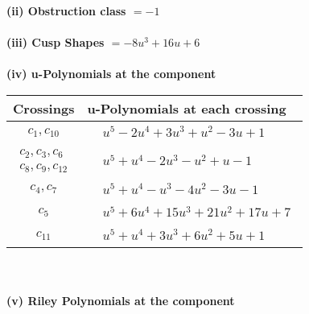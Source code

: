 \documentclass[1p]{elsarticle_modified}
\theoremstyle{definition}
\begin{document}
\flushleft \textbf{(ii) Obstruction class $= -1$}\\~\\
\flushleft \textbf{(iii) Cusp Shapes $= -8 u^3+16 u+6$}\\~\\
\newpage\renewcommand{\arraystretch}{1}
\flushleft \textbf{(iv) u-Polynomials at the component}\newline \\
\begin{tabular}{m{50pt}|m{274pt}}
Crossings & \hspace{64pt}u-Polynomials at each crossing \\
\hline $$\begin{aligned}c_{1},c_{10}\end{aligned}$$&$\begin{aligned}
&u^5-2 u^4+3 u^3+u^2-3 u+1
\end{aligned}$\\
\hline $$\begin{aligned}c_{2},c_{3},c_{6}\\c_{8},c_{9},c_{12}\end{aligned}$$&$\begin{aligned}
&u^5+u^4-2 u^3- u^2+u-1
\end{aligned}$\\
\hline $$\begin{aligned}c_{4},c_{7}\end{aligned}$$&$\begin{aligned}
&u^5+u^4- u^3-4 u^2-3 u-1
\end{aligned}$\\
\hline $$\begin{aligned}c_{5}\end{aligned}$$&$\begin{aligned}
&u^5+6 u^4+15 u^3+21 u^2+17 u+7
\end{aligned}$\\
\hline $$\begin{aligned}c_{11}\end{aligned}$$&$\begin{aligned}
&u^5+u^4+3 u^3+6 u^2+5 u+1
\end{aligned}$\\
\hline
\end{tabular}\\~\\
\newpage\renewcommand{\arraystretch}{1}
\flushleft \textbf{(v) Riley Polynomials at the component}\newline \\
\end{document}
